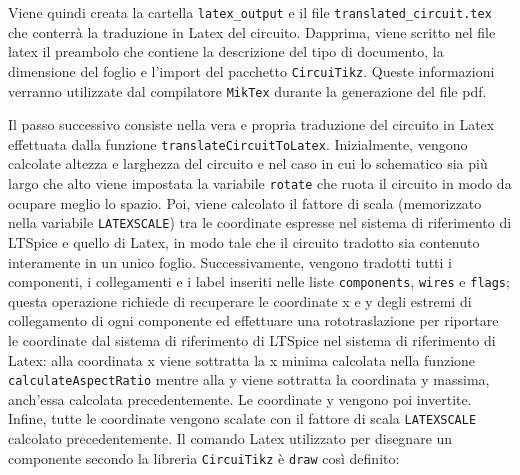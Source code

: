\noindent
Viene quindi creata la cartella \texttt{latex\_output} e il file \texttt{translated\_circuit.tex} che conterrà la traduzione in Latex del circuito. Dapprima, viene scritto nel file latex il preambolo che contiene la descrizione del tipo di documento, la dimensione del foglio e l'import del pacchetto \texttt{CircuiTikz}. Queste informazioni verranno utilizzate dal compilatore \texttt{MikTex} durante la generazione del file pdf.

\noindent
Il passo successivo consiste nella vera e propria traduzione del circuito in Latex effettuata dalla funzione \texttt{translateCircuitToLatex}. Inizialmente, vengono calcolate altezza e larghezza del circuito e nel caso in cui lo schematico sia più largo che alto viene impostata la variabile \texttt{rotate} che ruota il circuito in modo da ocupare meglio lo spazio. Poi, viene calcolato il fattore di scala (memorizzato nella variabile \texttt{LATEXSCALE}) tra le coordinate espresse nel sistema di riferimento di LTSpice e quello di Latex, in modo tale che il circuito tradotto sia contenuto interamente in un unico foglio. Successivamente, vengono tradotti tutti i componenti, i collegamenti e i label inseriti nelle liste \texttt{components}, \texttt{wires} e \texttt{flags}; questa operazione richiede di recuperare le coordinate x e y degli estremi di collegamento di ogni componente ed effettuare una rototraslazione per riportare le coordinate dal sistema di riferimento di LTSpice nel sistema di riferimento di Latex: alla coordinata x viene sottratta la x minima calcolata nella funzione \texttt{calculateAspectRatio} mentre alla y viene sottratta la coordinata y massima, anch'essa calcolata precedentemente. Le coordinate y vengono poi invertite. Infine, tutte le coordinate vengono scalate con il fattore di scala \texttt{LATEXSCALE} calcolato precedentemente. Il comando Latex utilizzato per disegnare un componente secondo la libreria \texttt{CircuiTikz} è \texttt{draw} così definito:
